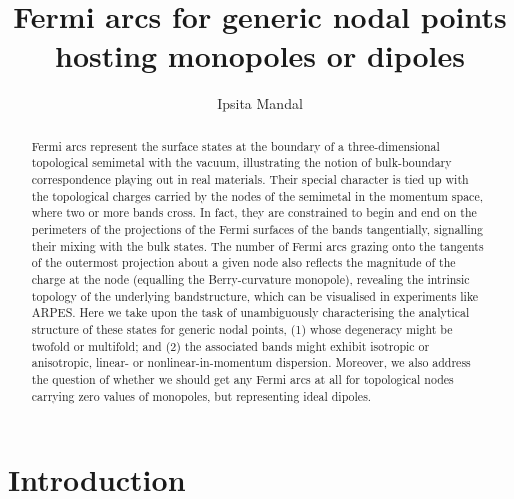 \documentclass[aps,prb,onecolumn, footinbib, 10pt]{revtex4-2}
\begin{document}
\title{Fermi arcs for generic nodal points hosting monopoles or dipoles}


\author{Ipsita Mandal}



\begin{abstract}
Fermi arcs represent the surface states at the boundary of a three-dimensional topological semimetal with the vacuum, illustrating the notion of bulk-boundary correspondence playing out in real materials. Their special character is tied up with the topological charges carried by the nodes of the semimetal in the momentum space, where two or more bands cross. In fact, they are constrained to begin and end on the perimeters of the projections of the Fermi surfaces of the bands tangentially, signalling their mixing with the bulk states. The number of Fermi arcs grazing onto the tangents of the outermost projection about a given node also reflects the magnitude of the charge at the node (equalling the Berry-curvature monopole), revealing the intrinsic topology of the underlying bandstructure, which can be visualised in experiments like ARPES. Here we take upon the task of unambiguously characterising the analytical structure of these states for generic nodal points, (1) whose degeneracy might be twofold or multifold; and (2) the associated bands might exhibit isotropic or anisotropic, linear- or nonlinear-in-momentum dispersion. Moreover, we also address the question of whether we should get any Fermi arcs at all for topological nodes carrying zero values of monopoles, but representing ideal dipoles.
\end{abstract}

\maketitle

\tableofcontents


\section{Introduction}
\end{document}
